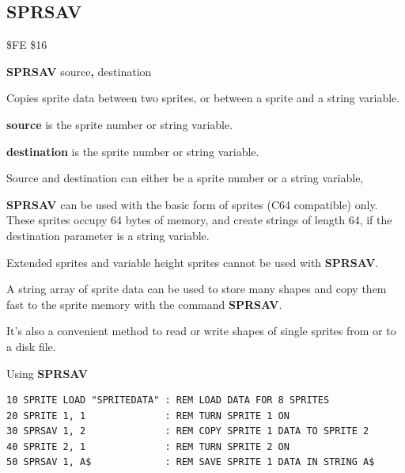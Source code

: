 \subsection{SPRSAV}
\begin{description}[leftmargin=2cm,style=nextline]
\item [Token:]    \$FE \$16

\item [Format:]   {\bf SPRSAV} source{\bf,} destination

\item [Usage:]    Copies sprite data between two sprites, or between a sprite and a string variable.

                  {\bf source} is the sprite number or string variable.

                  {\bf destination} is the sprite number or string variable.

\item [Remarks:]  Source and destination can either be a sprite number or a string variable,

                  {\bf SPRSAV} can be used with the basic form of sprites (C64 compatible) only. These sprites occupy 64 bytes of memory, and create strings of length 64, if the destination parameter is a string variable.

                  Extended sprites and variable height sprites cannot be used with {\bf SPRSAV}.

                  A string array of sprite data can be used to store many shapes and copy them fast to the sprite memory with the command {\bf SPRSAV}.

                  It's also a convenient method to read or write shapes of single sprites from or to a disk file.

\item [Example:]  Using {\bf SPRSAV}

\begin{tcolorbox}[colback=black,coltext=white]
\verbatimfont{\codefont}
\begin{verbatim}
10 SPRITE LOAD "SPRITEDATA" : REM LOAD DATA FOR 8 SPRITES
20 SPRITE 1, 1              : REM TURN SPRITE 1 ON
30 SPRSAV 1, 2              : REM COPY SPRITE 1 DATA TO SPRITE 2
40 SPRITE 2, 1              : REM TURN SPRITE 2 ON
50 SPRSAV 1, A$             : REM SAVE SPRITE 1 DATA IN STRING A$
\end{verbatim}
\end{tcolorbox}
\end{description}

